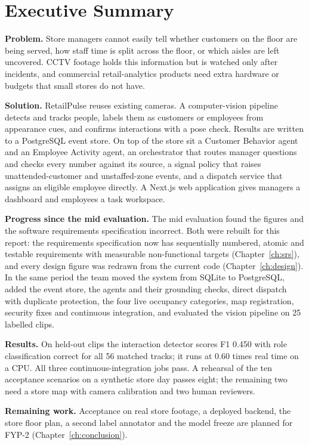 \chapter*{Executive Summary}
\textbf{Problem.} Store managers cannot easily tell whether customers on the floor are being served, how staff time is split across the floor, or which aisles are left uncovered. CCTV footage holds this information but is watched only after incidents, and commercial retail-analytics products need extra hardware or budgets that small stores do not have.

\textbf{Solution.} RetailPulse reuses existing cameras. A computer-vision pipeline detects and tracks people, labels them as customers or employees from appearance cues, and confirms interactions with a pose check. Results are written to a PostgreSQL event store. On top of the store sit a Customer Behavior agent and an Employee Activity agent, an orchestrator that routes manager questions and checks every number against its source, a signal policy that raises unattended-customer and unstaffed-zone events, and a dispatch service that assigns an eligible employee directly. A Next.js web application gives managers a dashboard and employees a task workspace.

\textbf{Progress since the mid evaluation.} The mid evaluation found the figures and the software requirements specification incorrect. Both were rebuilt for this report: the requirements specification now has sequentially numbered, atomic and testable requirements with measurable non-functional targets (Chapter~\ref{ch:srs}), and every design figure was redrawn from the current code (Chapter~\ref{ch:design}). In the same period the team moved the system from SQLite to PostgreSQL, added the event store, the agents and their grounding checks, direct dispatch with duplicate protection, the four live occupancy categories, map registration, security fixes and continuous integration, and evaluated the vision pipeline on 25 labelled clips.

\textbf{Results.} On held-out clips the interaction detector scores F1 0.450 with role classification correct for all 56 matched tracks; it runs at 0.60 times real time on a CPU. All three continuous-integration jobs pass. A rehearsal of the ten acceptance scenarios on a synthetic store day passes eight; the remaining two need a store map with camera calibration and two human reviewers.

\textbf{Remaining work.} Acceptance on real store footage, a deployed backend, the store floor plan, a second label annotator and the model freeze are planned for FYP-2 (Chapter~\ref{ch:conclusion}).
